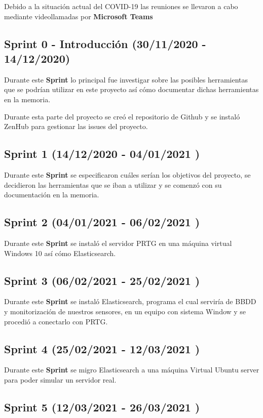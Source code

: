 Debido a la situación actual del COVID-19 las reuniones se llevaron a cabo mediante videollamadas por \textbf{Microsoft Teams}

\subsection{Sprint 0 - Introducción (30/11/2020 - 14/12/2020)}

Durante este \textbf{Sprint} lo principal fue investigar sobre las posibles herramientas que se podrían utilizar en este proyecto así cómo documentar dichas herramientas en la memoria.

Durante esta parte del proyecto se creó el repositorio de Github y se instaló ZenHub para gestionar las issues del proyecto.

\subsection{Sprint 1   (14/12/2020 - 04/01/2021 )}

Durante este \textbf{Sprint} se especificaron cuáles serían los objetivos del proyecto, se decidieron las herramientas que se iban a utilizar y se comenzó con su documentación en la memoria.

\subsection{Sprint 2   (04/01/2021 - 06/02/2021 )}

Durante este \textbf{Sprint} se instaló el servidor PRTG en una máquina virtual Windows 10 así cómo Elasticsearch. 

\subsection{Sprint 3   (06/02/2021 - 25/02/2021 )}

Durante este \textbf{Sprint} se instaló Elasticsearch, programa el cual serviría de BBDD y monitorización de nuestros sensores, en un equipo con sistema Window y se procedió a conectarlo con PRTG. 

\subsection{Sprint 4   (25/02/2021 - 12/03/2021 )}
Durante este \textbf{Sprint} se migro Elasticsearch a una máquina Virtual Ubuntu server para poder simular un servidor real.


\subsection{Sprint 5   (12/03/2021 - 26/03/2021 )}

